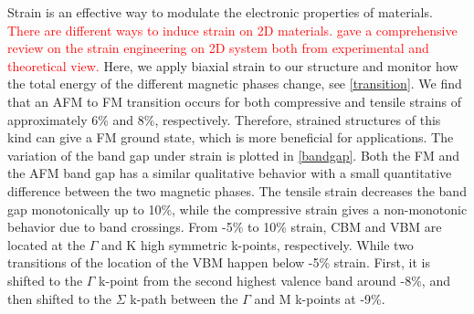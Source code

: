 Strain is an effective way to modulate the electronic properties of materials. \textcolor{red}{There are different ways to induce strain on 2D materials. \citet{Roldan2015} gave a comprehensive review on the strain engineering on 2D system both from experimental and theoretical view. }Here, we apply biaxial strain to our structure and monitor how the total energy of the different magnetic phases change, see \autoref{transition}. We find that an AFM to FM transition occurs for both compressive and tensile strains of approximately 6\% and 8\%, respectively. Therefore, strained structures of this kind can give a FM ground state, which is more beneficial for applications. The variation of the band gap under strain is plotted in \autoref{bandgap}. Both the FM and the AFM band gap has a similar qualitative behavior with a small quantitative difference between the two magnetic phases. The tensile strain decreases the band gap monotonically up to 10\%, while the compressive strain gives a non-monotonic behavior due to band crossings. From -5\% to 10\% strain, CBM and VBM are located at the $\Gamma$ and K high symmetric k-points, respectively. While two transitions of the location of the VBM happen below -5\% strain. First, it is shifted to the $\Gamma$ k-point from the second highest valence band around -8\%, and then shifted to the $\Sigma$ k-path between the $\Gamma$ and M k-points at -9\%.

